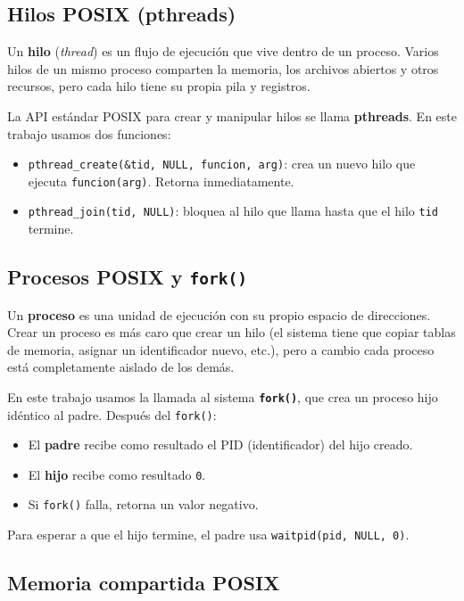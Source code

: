\subsection{Hilos POSIX (pthreads)}

Un \textbf{hilo} (\textit{thread}) es un flujo de ejecución que vive dentro de un proceso. Varios hilos de un mismo proceso comparten la memoria, los archivos abiertos y otros recursos, pero cada hilo tiene su propia pila y registros.

La API estándar POSIX para crear y manipular hilos se llama \textbf{pthreads}. En este trabajo usamos dos funciones:

\begin{itemize}
    \item \texttt{pthread\_create(\&tid, NULL, funcion, arg)}: crea un nuevo hilo que ejecuta \texttt{funcion(arg)}. Retorna inmediatamente.
    \item \texttt{pthread\_join(tid, NULL)}: bloquea al hilo que llama hasta que el hilo \texttt{tid} termine.
\end{itemize}

\subsection{Procesos POSIX y \texttt{fork()}}

Un \textbf{proceso} es una unidad de ejecución con su propio espacio de direcciones. Crear un proceso es más caro que crear un hilo (el sistema tiene que copiar tablas de memoria, asignar un identificador nuevo, etc.), pero a cambio cada proceso está completamente aislado de los demás.

En este trabajo usamos la llamada al sistema \textbf{\texttt{fork()}}, que crea un proceso hijo idéntico al padre. Después del \texttt{fork()}:

\begin{itemize}
    \item El \textbf{padre} recibe como resultado el PID (identificador) del hijo creado.
    \item El \textbf{hijo} recibe como resultado \texttt{0}.
    \item Si \texttt{fork()} falla, retorna un valor negativo.
\end{itemize}

Para esperar a que el hijo termine, el padre usa \texttt{waitpid(pid, NULL, 0)}.

\subsection{Memoria compartida POSIX}

